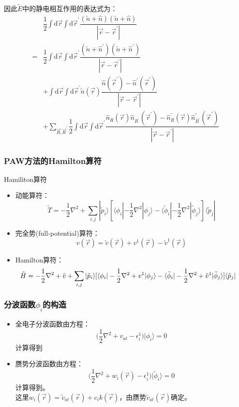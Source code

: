 \documentclass[cjk,slidestop,compress,mathserif,blue]{beamer}
\begin{document}
\frame
{
	\frametitle{}
因此$\tilde E$中的静电相互作用的表达式为：
\begin{displaymath}
	\begin{aligned}
		&\dfrac12\int\mathrm{d}\vec r\int\mathrm{d}\vec r^{\prime}\dfrac{(\tilde n+\hat n)(\tilde n+\hat n)}{|\vec r-\vec r^{\prime}|}\\
	=&\dfrac12\int\mathrm{d}\vec r\int\mathrm{d}\vec r^{\prime}\dfrac{(\tilde n+\hat n^{\prime})(\tilde n+\hat n^{\prime})}{|\vec r-\vec r^{\prime}|}\\
		&+\int\mathrm{d}\vec r\int\mathrm{d}\vec r^{\prime}\tilde n(\vec r)\dfrac{\hat n(\vec r^{\prime})-\hat n^{\prime}(\vec r^{\prime})}{|\vec r-\vec r^{\prime}|}\\
		&+\sum_{\vec R,\vec R^{\prime}}\dfrac12\int\mathrm{d}\vec r\int\mathrm{d}\vec r^{\prime}\dfrac{\hat n_R(\vec r)\hat n_{R^{\prime}}(\vec r^{\prime})-\hat n^{\prime}_R(\vec r)\hat n^{\prime}_{R^{\prime}}(\vec r^{\prime})}{|\vec r-\vec r^{\prime}|}
	\end{aligned}
\end{displaymath}
}

\frame
{
	\frametitle{PAW方法的Hamilton算符}
\textrm{Hamiliton}算符
\begin{itemize}
	\item 动能算符：
		$$\tilde T=-\dfrac12\nabla^2+\sum_{i,j}|\tilde p_i\rangle[\langle\phi_i|-\dfrac12\nabla^2|\phi_j\rangle-\langle\tilde\phi_i|-\dfrac12\nabla^2|\tilde\phi_j\rangle]\langle\tilde p_j|$$
	\item 完全势\textrm{(full-potential)}算符：
$$v(\vec r)=\tilde v(\vec r)+v^1(\vec r)-\tilde v^1(\vec r)$$
	\item \textrm{Hamilton}算符：
		$$\hspace*{-10pt}\tilde H=-\dfrac12\nabla^2+\tilde v+\sum_{i,j}|\tilde p_i\rangle[\langle\phi_i|-\dfrac12\nabla^2+v^1|\phi_j\rangle-\langle\tilde\phi_i|-\dfrac12\nabla^2+\tilde v^1|\tilde\phi_j\rangle]\langle\tilde p_j|$$
\end{itemize}
}

\frame
{
	\frametitle{分波函数$\phi_i$的构造}
	\begin{itemize}
		\item 全电子分波函数由方程：
			$$\biggl(\dfrac12\nabla^2+v_{at}-\epsilon_i^1\biggr)|\phi_i\rangle=0$$
			计算得到
		\item 赝势分波函数由方程：
			$$\biggl(\dfrac12\nabla^2+w_{i}(\vec r)-\epsilon_i^1\biggr)|\tilde\phi_i\rangle=0$$
			计算得到。\\
			这里$w_i(\vec r)=\tilde v_{at}(\vec r)+c_ik(\vec r)$，由赝势$\tilde v_{at}(\vec r)$确定。
		\end{itemize}
}
\end{document}
